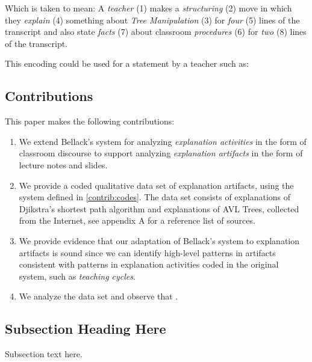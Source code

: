 \documentclass[conference]{IEEEtran}
\begin{document}
Which is taken to mean: A \emph{teacher} (1) makes a \emph{structuring} (2) move
in which they \emph{explain} (4) something about \emph{Tree Manipulation} (3) for
\emph{four} (5) lines of the transcript and also state \emph{facts} (7) about
classroom \emph{procedures} (6) for \emph{two} (8) lines of the transcript.

This encoding could be used for a statement by a teacher such as:


\subsection{Contributions}
This paper makes the following contributions:
%
\begin{enumerate}[C1.]

\item \label{contrib:codes}
%
We extend Bellack's system for analyzing \emph{explanation activities} in the
form of classroom discourse to support analyzing \emph{explanation artifacts}
in the form of lecture notes and slides.

\item \label{contrib:data}
%
We provide a coded qualitative data set of explanation artifacts, using the
system defined in \ref{contrib:codes}. The data set consists of 
explanations of Djikstra's shortest path algorithm and  explanations
of AVL Trees, collected from the Internet, see appendix A for a reference list
of sources.

\item \label{contrib:valid}
%
We provide evidence that our adaptation of Bellack's system to explanation
artifacts is sound since we can identify high-level patterns in artifacts
consistent with patterns in explanation activities coded in the original
system, such as \emph{teaching cycles}.

\item \label{contrib:valid}
%
We analyze the data set and observe that .

\end{enumerate}


\subsection{Subsection Heading Here}
Subsection text here.
\end{document}
